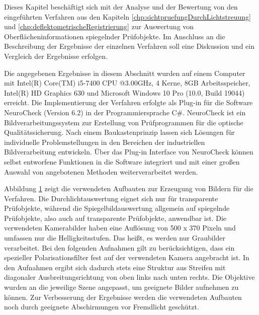 Dieses Kapitel beschäftigt sich mit der Analyse und der Bewertung von den eingeführten Verfahren aus den Kapiteln \ref{chp:sichtpruefungDurchLichtstreuung} und \ref{chp:deflektometrischeRegistrierung} zur Auswertung von Oberflächeninformationen spiegelnder Prüfobjekte.
Im Anschluss an die Beschreibung der Ergebnisse der einzelnen Verfahren soll eine Diskussion und ein Vergleich der Ergebnisse erfolgen.

\p
Die angegebenen Ergebnisse in diesem Abschnitt wurden auf einem Computer mit Intel(R) Core(TM) i5-7400 CPU @3.00GHz, 4 Kerne, 8GB Arbeitsspeicher, Intel(R) HD Graphics 630 und Microsoft Windows 10 Pro (10.0, Build 19044) erreicht.
Die Implementierung der Verfahren erfolgte als Plug-in für die Software NeuroCheck (Version 6.2) in der Programmiersprache C\#.
NeuroCheck ist ein Bildverarbeitungssystem zur Erstellung von Prüfprogrammen für die optische Qualitätssicherung.
Nach einem Baukastenprinzip lassen sich Lösungen für individuelle Problemstellungen in den Bereichen der industriellen Bildverarbeitung entwickeln.
Über das Plug-in Interface von NeuroCheck können selbst entworfene Funktionen in die Software integriert und mit einer großen Auswahl von angebotenen Methoden weiterverarbeitet werden.

{
	\begin{figure}[H]
		\centering
		
		\label{tikz:abbAufbauFotos}
	\end{figure}
}

\noindent
Abbildung \ref{tikz:abbAufbauFotos} zeigt die verwendeten Aufbauten zur Erzeugung von Bildern für die Verfahren.
Die Durchlichtauswertung eignet sich nur für transparente Prüfobjekte, während die Spiegelbildauswertung allgemein auf spiegelnde Prüfobjekte, also auch auf transparente Prüfobjekte, anwendbar ist.
Die verwendeten Kamerabilder haben eine Auflösung von 500 x 370 Pixeln und umfassen nur die Helligkeitsstufen. 
Das heißt, es werden nur Graubilder verarbeitet.
Bei den folgenden Aufnahmen gilt zu berücksichtigen, dass ein spezieller Polarisationsfilter fest auf der verwendeten Kamera angebracht ist.
In den Aufnahmen ergibt sich dadurch stets eine Struktur aus Streifen mit diagonaler Ausbreitungsrichtung von oben links nach unten rechts.
Die Objektive wurden an die jeweilige Szene angepasst, um geeignete Bilder aufnehmen zu können.
Zur Verbesserung der Ergebnisse werden die verwendeten Aufbauten noch durch geeignete Abschirmungen vor Fremdlicht geschützt.

